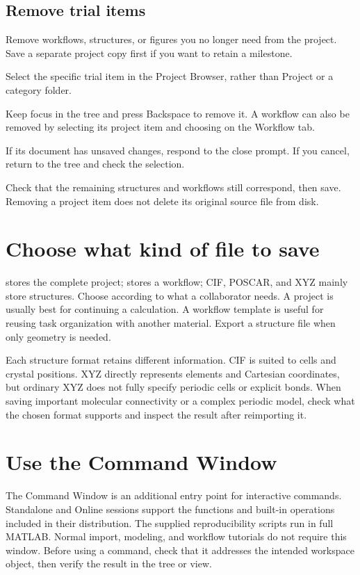 \subsection{Remove trial items}

Remove workflows, structures, or figures you no longer need from the project. Save a separate project copy first if you want to retain a milestone.

\begin{steps}
\item Select the specific trial item in the Project Browser, rather than Project or a category folder.
\item Keep focus in the tree and press Backspace to remove it. A workflow can also be removed by selecting its project item and choosing  on the Workflow tab.
\item If its document has unsaved changes, respond to the close prompt. If you cancel, return to the tree and check the selection.
\item Check that the remaining structures and workflows still correspond, then save. Removing a project item does not delete its original source file from disk.
\end{steps}

\section{Choose what kind of file to save}
 stores the complete project;  stores a workflow; CIF, POSCAR, and XYZ mainly store structures. Choose according to what a collaborator needs. A project is usually best for continuing a calculation. A workflow template is useful for reusing task organization with another material. Export a structure file when only geometry is needed.

Each structure format retains different information. CIF is suited to cells and crystal positions. XYZ directly represents elements and Cartesian coordinates, but ordinary XYZ does not fully specify periodic cells or explicit bonds. When saving important molecular connectivity or a complex periodic model, check what the chosen format supports and inspect the result after reimporting it.

\section{Use the Command Window}
The Command Window is an additional entry point for interactive commands. Standalone and Online sessions support the functions and built-in operations included in their distribution. The supplied reproducibility scripts run in full MATLAB\regmark{}. Normal import, modeling, and workflow tutorials do not require this window. Before using a command, check that it addresses the intended workspace object, then verify the result in the tree or view.

